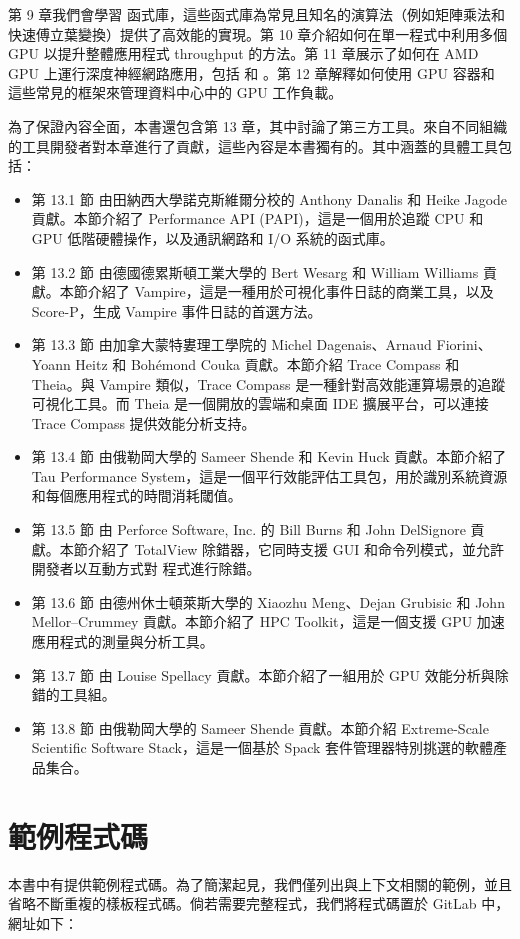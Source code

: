 第 9 章我們會學習  函式庫，這些函式庫為常見且知名的演算法（例如矩陣乘法和快速傅立葉變換）提供了高效能的實現。第 10 章介紹如何在單一程式中利用多個 GPU 以提升整體應用程式 throughput 的方法。第 11 章展示了如何在 AMD GPU 上運行深度神經網路應用，包括  和 。第 12 章解釋如何使用 GPU 容器和  這些常見的框架來管理資料中心中的 GPU 工作負載。

為了保證內容全面，本書還包含第 13 章，其中討論了第三方工具。來自不同組織的工具開發者對本章進行了貢獻，這些內容是本書獨有的。其中涵蓋的具體工具包括：

\begin{itemize}
    \item 第 13.1 節 由田納西大學諾克斯維爾分校的 Anthony Danalis 和 Heike Jagode 貢獻。本節介紹了 Performance API (PAPI)，這是一個用於追蹤 CPU 和 GPU 低階硬體操作，以及通訊網路和 I/O 系統的函式庫。
    \item 第 13.2 節 由德國德累斯頓工業大學的 Bert Wesarg 和 William Williams 貢獻。本節介紹了 Vampire，這是一種用於可視化事件日誌的商業工具，以及 Score-P，生成 Vampire 事件日誌的首選方法。
    \item 第 13.3 節 由加拿大蒙特婁理工學院的 Michel Dagenais、Arnaud Fiorini、Yoann Heitz 和 Bohémond Couka 貢獻。本節介紹 Trace Compass 和 Theia。與 Vampire 類似，Trace Compass 是一種針對高效能運算場景的追蹤可視化工具。而 Theia 是一個開放的雲端和桌面 IDE 擴展平台，可以連接 Trace Compass 提供效能分析支持。
    \item 第 13.4 節 由俄勒岡大學的 Sameer Shende 和 Kevin Huck 貢獻。本節介紹了 Tau Performance System，這是一個平行效能評估工具包，用於識別系統資源和每個應用程式的時間消耗閾值。
    \item 第 13.5 節 由 Perforce Software, Inc. 的 Bill Burns 和 John DelSignore 貢獻。本節介紹了 TotalView 除錯器，它同時支援 GUI 和命令列模式，並允許開發者以互動方式對  程式進行除錯。
    \item 第 13.6 節 由德州休士頓萊斯大學的 Xiaozhu Meng、Dejan Grubisic 和 John Mellor–Crummey 貢獻。本節介紹了 HPC Toolkit，這是一個支援 GPU 加速應用程式的測量與分析工具。
    \item 第 13.7 節 由 Louise Spellacy 貢獻。本節介紹了一組用於 GPU 效能分析與除錯的工具組。
    \item 第 13.8 節 由俄勒岡大學的 Sameer Shende 貢獻。本節介紹 Extreme-Scale Scientific Software Stack，這是一個基於 Spack 套件管理器特別挑選的軟體產品集合。
\end{itemize}

\section*{範例程式碼}
本書中有提供範例程式碼。為了簡潔起見，我們僅列出與上下文相關的範例，並且省略不斷重複的樣板程式碼。倘若需要完整程式，我們將程式碼置於 GitLab 中，網址如下：

